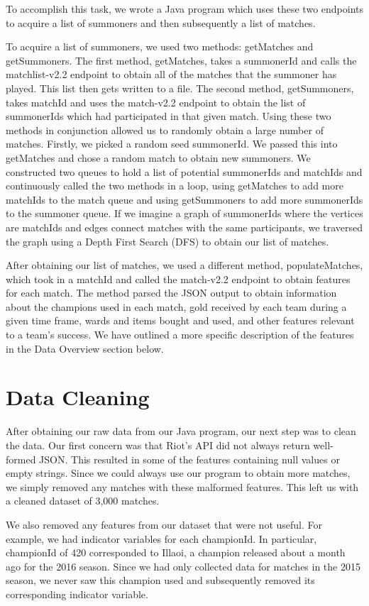 \documentclass[runningheads]{llncs}
\begin{document}
To accomplish this task, we wrote a Java program which uses these two endpoints to acquire a list of summoners and then subsequently a list of matches.

To acquire a list of summoners, we used two methods: getMatches and getSummoners. The first method, getMatches, takes a summonerId and calls the matchlist-v2.2 endpoint to obtain all of the matches that the summoner has played. This list then gets written to a file. The second method, getSummoners, takes matchId and uses the match-v2.2 endpoint to obtain the list of summonerIds which had participated in that given match. Using these two methods in conjunction allowed us to randomly obtain a large number of matches. Firstly, we picked a random seed summonerId. We passed this into getMatches and chose a random match to obtain new summoners. We constructed two queues to hold a list of potential summonerIds and matchIds and continuously called the two methods in a loop, using getMatches to add more matchIds to the match queue and using getSummoners to add more summonerIds to the summoner queue. If we imagine a graph of summonerIds where the vertices are matchIds and edges connect matches with the same participants, we traversed the graph using a Depth First Search (DFS) to obtain our list of matches.

After obtaining our list of matches, we used a different method, populateMatches, which took in a matchId and called the match-v2.2 endpoint to obtain features for each match. The method parsed the JSON output to obtain information about the champions used in each match, gold received by each team during a given time frame, wards and items bought and used, and other features relevant to a team’s success. We have outlined a more specific description of the features in the Data Overview section below.

	\section{Data Cleaning}
	
	After obtaining our raw data from our Java program, our next step was to clean the data. Our first concern was that Riot’s API did not always return well-formed JSON. This resulted in some of the features containing null values or empty strings. Since we could always use our program to obtain more matches, we simply removed any matches with these malformed features. This left us with a cleaned dataset of 3,000 matches.

We also removed any features from our dataset that were not useful. For example, we had indicator variables for each championId. In particular, championId of 420 corresponded to Illaoi, a champion released about a month ago for the 2016 season. Since we had only collected data for matches in the 2015 season, we never saw this champion used and subsequently removed its corresponding indicator variable.
	
\end{document}
